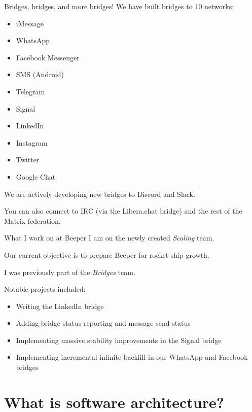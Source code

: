 \documentclass{beeper}
\begin{document}
\begin{frame}{Bridges, bridges, and more bridges!}
    We have built bridges to 10 networks:
    \begin{multicols}{2}
        \begin{itemize}
            \item iMessage
            \item WhatsApp
            \item Facebook Messenger
            \item SMS (Android)
            \item Telegram
            \item Signal
            \item LinkedIn
            \item Instagram
            \item Twitter
            \item Google Chat
        \end{itemize}
    \end{multicols}

    \pause
    We are actively developing new bridges to Discord and Slack.

    \pause
    You can also connect to IRC (via the Libera.chat bridge) and the rest of the
    Matrix federation.
\end{frame}

\begin{frame}{What I work on at Beeper}
    I am on the newly created \textit{Scaling} team.

    Our current objective is to prepare Beeper for rocket-ship growth.
    \vspace{0.5cm}
    \pause

    I was previously part of the \textit{Bridges} team. 

    Notable projects included:
    \begin{itemize}
        \item Writing the LinkedIn bridge
        \item Adding bridge status reporting and message send status
        \item Implementing massive stability improvements in the Signal bridge
        \item Implementing incremental infinite backfill in our WhatsApp and
            Facebook bridges
    \end{itemize}
\end{frame}

\section{What is software architecture?}
\end{document}
